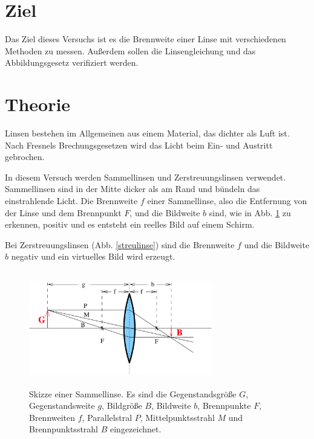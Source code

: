\section{Ziel}
Das Ziel dieses Versuchs ist es die Brennweite einer Linse mit verschiedenen Methoden zu messen. Außerdem sollen die Linsengleichung und das Abbildungsgesetz verifiziert werden.

\section{Theorie}
\label{sec:Theorie}

Linsen bestehen im Allgemeinen aus einem Material, das dichter als Luft ist.
Nach Fresnels Brechungsgesetzen wird das Licht beim Ein- und Austritt gebrochen.

\noindent In diesem Versuch werden Sammellinsen und Zerstreuungslinsen verwendet. Sammellinsen sind in der Mitte dicker als am Rand und bündeln das einstrahlende Licht. Die Brennweite $f$ einer Sammellinse, also die Entfernung von der Linse und dem Brennpunkt $F$, und die Bildweite $b$ sind, wie in Abb. \ref{sammellinse} zu erkennen, positiv und es entsteht ein reelles Bild auf einem Schirm.

\noindent Bei Zerstreuungslinsen (Abb. \ref{streulinse}) sind die Brennweite $f$ und die Bildweite $b$ negativ und ein virtuelles Bild wird erzeugt.

\begin{figure}
    \centering
    \includegraphics[width=8cm, height=5cm]{build/sammellinse.png}
    \caption{Skizze einer Sammellinse. Es sind die Gegenstandsgröße $G$, Gegenstandsweite $g$, Bildgröße $B$, Bildweite $b$, Brennpunkte $F$, Brennweiten $f$, Parallelstral $P$, Mittelpunktsstrahl $M$ und Brennpunktsstrahl $B$ eingezeichnet. \cite{V408}}
    \label{sammellinse}
\end{figure}

